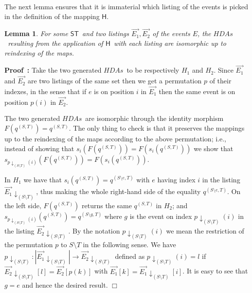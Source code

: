 \documentclass[submission,copyright,creativecommons]{eptcs}
\newtheorem{lemma}[theorem]{Lemma}
\newenvironment{proof}[1][\!\!\,]{\vspace{1ex}\noindent\textbf{Proof #1: }}{\hfill$\Box$\vspace{2ex}}
\newcommand\evlist[1]{\ensuremath{\overrightarrow{#1}}}
\newcommand\HDAs{\ensuremath{\mathit{HDAs}}}
\newcommand\ST{\ensuremath{\mathsf{ST}}}
\newcommand\stintoh{\ensuremath{\mathsf{H}}}
\begin{document}
The next lemma ensures that it is immaterial which listing of the events is picked in the definition of the mapping \stintoh.

\begin{lemma}\label{lemma_listings_different}
For some \ST\ and two listings $\evlist{E_{1}},\evlist{E_{2}}$ of the events $E$, the \HDAs\ resulting from the application of \stintoh\ with each listing are isomorphic up to reindexing of the maps.
\end{lemma}

\begin{proof}
Take the two generated \HDAs\ to be respectively  $H_{1}$ and $H_{2}$. Since $\evlist{E_{1}}$ and $\evlist{E_{2}}$ are two listings of the same set then we get a permutation $p$ of their indexes, in the sense that if $e$ is on position $i$ in $\evlist{E_{1}}$ then the same event is on position $p(i)$ in $\evlist{E_{2}}$.

The two generated \HDAs\ are isomorphic through the identity morphism $F(q^{(S,T)})=q^{(S,T)}$. The only thing to check is that it preserves the mappings up to the reindexing of the maps according to the above permutation; i.e., instead of showing that $s_{i}(F(q^{(S,T)}))=F(s_{i}(q^{(S,T)}))$ we show that $s_{p\downarrow_{(S\setminus T)}(i)}(F(q^{(S,T)}))=F(s_{i}(q^{(S,T)}))$.

In $H_{1}$ we have that $s_{i}(q^{(S,T)})=q^{(S\setminus e,T)}$ with $e$ having index $i$ in the listing $\evlist{E_{1}}\!\downarrow_{(S\setminus T)}$, thus making the whole right-hand side of the equality $q^{(S\setminus e,T)}$. On the left side, $F(q^{(S,T)})$ returns the same $q^{(S,T)}$ in $H_{2}$; and $s_{p\downarrow_{(S\setminus T)}(i)}(q^{(S,T)})=q^{(S\setminus g,T)}$ where $g$ is the event on index $p\downarrow_{(S\setminus T)}(i)$ in the listing $\evlist{E_{2}}\!\downarrow_{(S\setminus T)}$. By the notation $p\downarrow_{(S\setminus T)}(i)$ we mean the restriction of the permutation $p$ to $S\setminus T$ in the following sense. We have $p\downarrow_{(S\setminus T)}:|\evlist{E_{1}}\!\downarrow_{(S\setminus T)}|\rightarrow \evlist{E_{2}}\!\downarrow_{(S\setminus T)}$ defined as $p\downarrow_{(S\setminus T)}(i)=l$ if $\evlist{E_{2}}\!\downarrow_{(S\setminus T)}[l]=\evlist{E_{2}}[p(k)]$ with $\evlist{E_{1}}[k]=\evlist{E_{1}}\!\downarrow_{(S\setminus T)}[i]$.
It is easy to see that $g=e$ and hence the desired result.
\end{proof}
\end{document}
